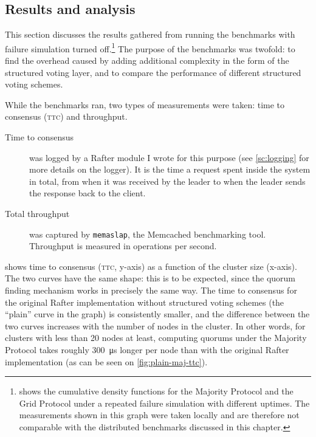 \documentclass[12pt,chapterprefix=true,toc=bibliography,numbers=noendperiod,
               footnotes=multiple,twoside]{scrreprt}
\begin{document}
\subsection{Results and analysis}
\label{ssc:results}

This section discusses the results gathered from running the benchmarks with failure simulation turned off.\footnote{ shows the cumulative density functions for the Majority Protocol and the Grid Protocol under a repeated failure simulation with different uptimes. The measurements shown in this graph were taken locally and are therefore not comparable with the distributed benchmarks discussed in this chapter.} The purpose of the benchmarks was twofold: to find the overhead caused by adding additional complexity in the form of the structured voting layer, and to compare the performance of different structured voting schemes.

While the benchmarks ran, two types of measurements were taken: time to consensus (\textsc{ttc}) and throughput.

\begin{description}
    \item[Time to consensus] was logged by a Rafter module I wrote for this purpose (see \cref{sc:logging} for more details on the logger). It is the time a request spent inside the system in total, from when it was received by the leader to when the leader sends the response back to the client.
    \item[Total throughput] was captured by \texttt{memaslap}, the Memcached benchmarking tool. Throughput is measured in operations per second.
\end{description}


 shows time to consensus (\textsc{ttc}, y-axis) as a function of the cluster size (x-axis). The two curves have the same shape: this is to be expected, since the quorum finding mechanism works in precisely the same way. The time to consensus for the original Rafter implementation without structured voting schemes (the \enquote{plain} curve in the graph) is consistently smaller, and the difference between the two curves increases with the number of nodes in the cluster. In other words, for clusters with less than 20 nodes at least, computing quorums under the Majority Protocol takes roughly \SI{300}{\micro\second} longer per node than with the original Rafter implementation (as can be seen on \cref{fig:plain-maj-ttc}).
\end{document}
